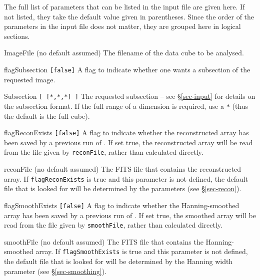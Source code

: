 \label{app-param}

The full list of parameters that can be listed in the input file are
given here. If not listed, they take the default value given in
parentheses. Since the order of the parameters in the input file does
not matter, they are grouped here in logical sections.

\begin{entry}
\item[ImageFile (no default assumed)] The filename of the
  data cube to be analysed.
\item[flagSubsection \texttt{[false]}] A flag to indicate whether one
  wants a subsection of the requested image.
\item[Subsection \texttt{[ [*,*,*] ]}] The requested subsection
 -- see \S\ref{sec-input} for details on the subsection format.  If
 the full range of a dimension is required, use a \texttt{*} (thus the
 default is the full cube).
\item[flagReconExists \texttt{[false]}] A flag to indicate whether the
  reconstructed array has been saved by a previous run of \duchamp. If
  set true, the reconstructed array will be read from the file given
  by \texttt{reconFile}, rather than calculated directly.
\item[reconFile (no default assumed)] The FITS file that contains the
  reconstructed array. If \texttt{flagReconExists} is true and this
  parameter is not defined, the default file that is looked for will
  be determined by the \atrous parameters (see \S\ref{sec-recon}).
\item[flagSmoothExists \texttt{[false]}] A flag to indicate whether the
  Hanning-smoothed array has been saved by a previous run of \duchamp. If
  set true, the smoothed array will be read from the file given
  by \texttt{smoothFile}, rather than calculated directly.
\item[smoothFile (no default assumed)] The FITS file that contains the
  Hanning-smoothed array. If \texttt{flagSmoothExists} is true and
  this parameter is not defined, the default file that is looked for
  will be determined by the Hanning width parameter (see
  \S\ref{sec-smoothing}).
\end{entry}

